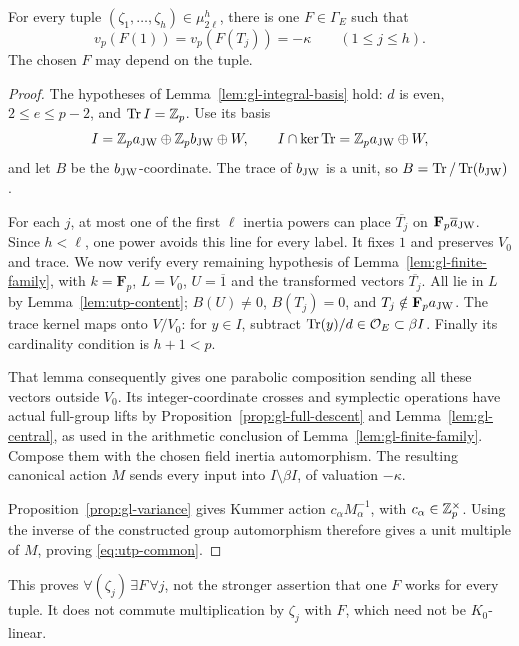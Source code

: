 \begin{theorem}
\label{thm:utp-common-arrow}
For every tuple $(\zeta_1,\ldots,\zeta_h)\in\mu_{2\ell}^h$,
there is one $F\in\Gamma_E$ such that
\begin{equation}\label{eq:utp-common}
 v_p(F(1))=v_p(F(T_j))=-\kappa
                      \qquad(1\le j\le h).
\end{equation}
The chosen $F$ may depend on the tuple.
\end{theorem}
\begin{proof}
The hypotheses of Lemma~\ref{lem:gl-integral-basis} hold:
$d$ is even, $2\le e\le p-2$, and $\operatorname{Tr}I=\mathbb Z_p$.
Use its basis
\[
 I=\mathbb Z_p a_{\rm JW}\oplus\mathbb Z_p b_{\rm JW}\oplus W,\qquad
 I\cap\ker\operatorname{Tr}=\mathbb Z_p a_{\rm JW}\oplus W,
\]
and let $B$ be the $b_{\rm JW}$-coordinate. The trace of
$b_{\rm JW}$ is a unit, so $B=\operatorname{Tr}/
\operatorname{Tr}(b_{\rm JW})$.

For each $j$, at most one of the first $\ell$ inertia powers
can place $\overline{T_j}$ on
$\mathbf F_p\overline a_{\rm JW}$. Since $h<\ell$,
one power avoids this line for every label. It fixes $1$
and preserves $V_0$ and trace. We now verify every remaining
hypothesis of Lemma~\ref{lem:gl-finite-family}, with
$k=\mathbf F_p$, $L=V_0$, $U=\overline1$ and the transformed
vectors $\overline{T_j}$. All lie in $L$ by
Lemma~\ref{lem:utp-content}; $B(U)\ne0$, $B(T_j)=0$,
and $T_j\notin\mathbf F_p a_{\rm JW}$.
The trace kernel maps onto $V/V_0$: for $y\in I$,
subtract $\operatorname{Tr}(y)/d\in\mathcal O_E\subset\beta I$.
Finally its cardinality condition is $h+1<p$.

That lemma consequently gives one parabolic composition
sending all these vectors outside $V_0$. Its integer-coordinate
crosses and symplectic operations have actual full-group lifts
by Proposition~\ref{prop:gl-full-descent} and
Lemma~\ref{lem:gl-central}, as used in the arithmetic conclusion
of Lemma~\ref{lem:gl-finite-family}. Compose them with the
chosen field inertia automorphism. The resulting canonical
action $M$ sends every input into $I\setminus\beta I$, of
valuation $-\kappa$.

Proposition~\ref{prop:gl-variance} gives Kummer action
$c_\alpha M_\alpha^{-1}$, with $c_\alpha\in\mathbb Z_p^\times$.
Using the inverse of the constructed group automorphism
therefore gives a unit multiple of $M$, proving
\eqref{eq:utp-common}.
\end{proof}

This proves $\forall(\zeta_j)\,\exists F\,\forall j$,
not the stronger assertion that one $F$ works for every
tuple. It does not commute multiplication by $\zeta_j$
with $F$, which need not be $K_0$-linear.

